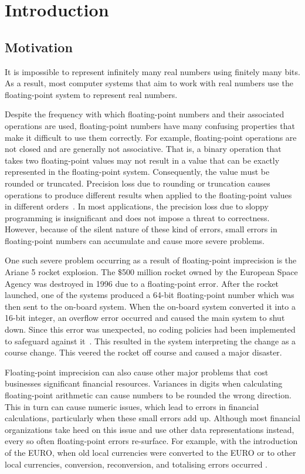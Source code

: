 \section{Introduction}

\subsection{Motivation}

It is impossible to represent infinitely many real numbers using finitely many bits. As a result, most computer systems that aim to work with real numbers use the floating-point system to represent real numbers.

Despite the frequency with which floating-point numbers and their associated operations are used, floating-point numbers have many confusing properties that make it difficult to use them correctly. For example, floating-point operations are not closed and are generally not associative. That is, a binary operation that takes two floating-point values may not result in a value that can be exactly represented in the floating-point system. Consequently, the value must be rounded or truncated. Precision loss due to rounding or truncation causes operations to produce different results when applied to the floating-point values in different orders~\cite{whateverycomputer}. In most applications, the precision loss due to sloppy programming is insignificant and does not impose a threat to correctness. However, because of the silent nature of these kind of errors, small errors in floating-point numbers can accumulate and cause more severe problems.

One such severe problem occurring as a result of floating-point imprecision is the Ariane 5 rocket explosion. The \$500 million rocket owned by the European Space Agency was destroyed in 1996 due to a floating-point error. After the rocket launched, one of the systems produced a 64-bit floating-point number which was then sent to the on-board system. When the on-board system converted it into a 16-bit integer, an overflow error occurred and caused the main system to shut down. Since this error was unexpected, no coding policies had been implemented to safeguard against it~\cite{disasters}. This resulted in the system interpreting the change as a course change. This veered the rocket off course and caused a major disaster.

Floating-point imprecision can also cause other major problems that cost businesses significant financial resources. Variances in digits when calculating floating-point arithmetic can cause numbers to be rounded the wrong direction. This in turn can cause numeric issues, which lead to errors in financial calculations, particularly when these small errors add up. Although most financial organizations take heed on this issue and use other data representations instead, every so often floating-point errors re-surface. For example, with the introduction of the EURO, when old local currencies were converted to the EURO or to other local currencies, conversion, reconversion, and totalising errors occurred \cite{disasters}.

